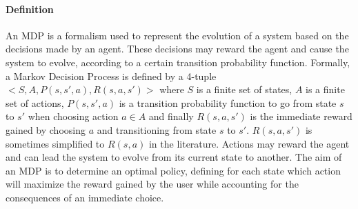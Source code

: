\paragraph{Definition}
An MDP is a formalism used to represent the evolution of a system based on the decisions made by an agent.
These decisions may reward the agent and cause the system to evolve, according to a certain transition probability function.
Formally, a Markov Decision Process is defined by a 4-tuple $<S,A,P(s,s',a),R(s,a,s')>$ where $S$ is a finite set of states, $A$ is a finite set of actions, $P(s,s',a)$ is a transition probability function to go from state $s$ to $s'$ when choosing action $a \in A$ and finally $R(s,a,s')$ is the immediate reward gained by choosing $a$ and transitioning from state $s$ to $s'$. $R(s,a,s')$ is sometimes simplified to $R(s,a)$ in the literature.
Actions may reward the agent and can lead the system to evolve from its current state to another.
The aim of an MDP is to determine an optimal policy, defining for each state which action will maximize the reward gained by the user while accounting for the consequences of an immediate choice.


